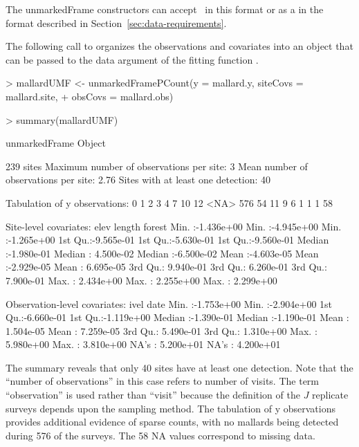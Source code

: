 \documentclass[article,shortnames]{jss}
\newcommand{\ocovs}{\code{obsCovs}}
\begin{document}
{The unmarkedFrame constructors can accept \ocovs\ in this  format or
as a  in the format described in
Section~\ref{sec:data-requirements}.

The following call to  organizes the observations
and covariates into an object that can be passed to the data argument of
the fitting function .

\begin{Schunk}
\begin{Sinput}
> mallardUMF <- unmarkedFramePCount(y = mallard.y, siteCovs = mallard.site, 
+     obsCovs = mallard.obs)
\end{Sinput}
\end{Schunk}

\begin{Schunk}
\begin{Sinput}
> summary(mallardUMF)
\end{Sinput}
\begin{Soutput}
unmarkedFrame Object

239 sites
Maximum number of observations per site: 3 
Mean number of observations per site: 2.76 
Sites with at least one detection: 40 

Tabulation of y observations:
   0    1    2    3    4    7   10   12 <NA> 
 576   54   11    9    6    1    1    1   58 

Site-level covariates:
      elev                length               forest          
 Min.   :-1.436e+00   Min.   :-4.945e+00   Min.   :-1.265e+00  
 1st Qu.:-9.565e-01   1st Qu.:-5.630e-01   1st Qu.:-9.560e-01  
 Median :-1.980e-01   Median : 4.500e-02   Median :-6.500e-02  
 Mean   :-4.603e-05   Mean   :-2.929e-05   Mean   : 6.695e-05  
 3rd Qu.: 9.940e-01   3rd Qu.: 6.260e-01   3rd Qu.: 7.900e-01  
 Max.   : 2.434e+00   Max.   : 2.255e+00   Max.   : 2.299e+00  

Observation-level covariates:
      ivel                 date           
 Min.   :-1.753e+00   Min.   :-2.904e+00  
 1st Qu.:-6.660e-01   1st Qu.:-1.119e+00  
 Median :-1.390e-01   Median :-1.190e-01  
 Mean   : 1.504e-05   Mean   : 7.259e-05  
 3rd Qu.: 5.490e-01   3rd Qu.: 1.310e+00  
 Max.   : 5.980e+00   Max.   : 3.810e+00  
 NA's   : 5.200e+01   NA's   : 4.200e+01  
\end{Soutput}
\end{Schunk}

The summary reveals that only 40 sites have at least one
detection. Note that the ``number of observations'' in this case refers to
number of visits. The term ``observation'' is used rather than ``visit''
because the definition of the $J$ replicate surveys depends upon the
sampling method. The
tabulation of y observations provides additional evidence of sparse counts,
with no mallards being detected during 576 of the surveys. The 58 NA values
correspond to missing data.


}
\end{document}
